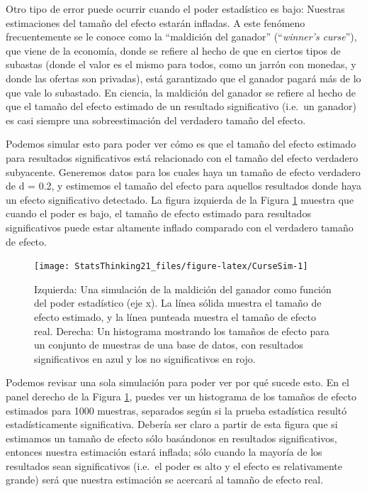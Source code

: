 \documentclass[
  12pt,
]{book}
\begin{document}
Otro tipo de error puede ocurrir cuando el poder estadístico es bajo: Nuestras estimaciones del tamaño del efecto estarán infladas. A este fenómeno frecuentemente se le conoce como la ``maldición del ganador'' (``\emph{winner's curse}''), que viene de la economía, donde se refiere al hecho de que en ciertos tipos de subastas (donde el valor es el mismo para todos, como un jarrón con monedas, y donde las ofertas son privadas), está garantizado que el ganador pagará más de lo que vale lo subastado. En ciencia, la maldición del ganador se refiere al hecho de que el tamaño del efecto estimado de un resultado significativo (i.e.~un ganador) es casi siempre una sobreestimación del verdadero tamaño del efecto.

Podemos simular esto para poder ver cómo es que el tamaño del efecto estimado para resultados significativos está relacionado con el tamaño del efecto verdadero subyacente. Generemos datos para los cuales haya un tamaño de efecto verdadero de d = 0.2, y estimemos el tamaño del efecto para aquellos resultados donde haya un efecto significativo detectado. La figura izquierda de la Figura \ref{fig:CurseSim} muestra que cuando el poder es bajo, el tamaño de efecto estimado para resultados significativos puede estar altamente inflado comparado con el verdadero tamaño de efecto.

\begin{figure}
\texttt{[image: StatsThinking21\_files/figure-latex/CurseSim-1]} \caption{Izquierda: Una simulación de la maldición del ganador como función del poder estadístico (eje x). La línea sólida muestra el tamaño de efecto estimado, y la línea punteada muestra el tamaño de efecto real. Derecha: Un histograma mostrando los tamaños de efecto para un conjunto de muestras de una base de datos, con resultados significativos en azul y los no significativos en rojo. }\label{fig:CurseSim}
\end{figure}

Podemos revisar una sola simulación para poder ver por qué sucede esto. En el panel derecho de la Figura \ref{fig:CurseSim}, puedes ver un histograma de los tamaños de efecto estimados para 1000 muestras, separados según si la prueba estadística resultó estadísticamente significativa. Debería ser claro a partir de esta figura que si estimamos un tamaño de efecto sólo basándonos en resultados significativos, entonces nuestra estimación estará inflada; sólo cuando la mayoría de los resultados sean significativos (i.e.~el poder es alto y el efecto es relativamente grande) será que nuestra estimación se acercará al tamaño de efecto real.
\end{document}

